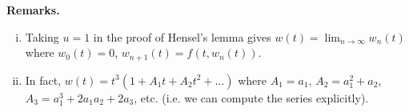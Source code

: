 \documentclass{article}
\theoremstyle{definition}
\begin{document}
\vspace{1mm}
 
\textbf{Remarks.} 
\begin{enumerate}[(i)]
    \item Taking $u=1$ in the proof of Hensel's lemma gives $w(t) = \lim_{n \to \infty} w_n(t)$ where $w_0(t)=0$, $w_{n+1}(t) = f(t,w_n(t))$.
    \item In fact, $w(t) = t^3(1+A_1t + A_2t^2 + \ldots)$ where $A_1 = a_1$, $A_2 = a_1^2+a_2$, $A_3 = a_1^3 + 2a_1a_2 + 2a_3$, etc. (i.e. we can compute the series explicitly).
\end{enumerate} 
\end{document}
